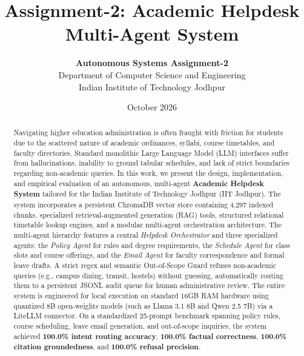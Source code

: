 \documentclass[10pt,a4paper]{article}
\title{\textbf{\Large Assignment-2: Academic Helpdesk Multi-Agent System}}
\author{\textbf{Autonomous Systems Assignment-2} \\
Department of Computer Science and Engineering \\
Indian Institute of Technology Jodhpur}
\date{October 2026}
\begin{document}
\maketitle

\begin{abstract}
Navigating higher education administration is often fraught with friction for students due to the scattered nature of academic ordinances, syllabi, course timetables, and faculty directories. Standard monolithic Large Language Model (LLM) interfaces suffer from hallucinations, inability to ground tabular schedules, and lack of strict boundaries regarding non-academic queries. In this work, we present the design, implementation, and empirical evaluation of an autonomous, multi-agent \textbf{Academic Helpdesk System} tailored for the Indian Institute of Technology Jodhpur (IIT Jodhpur). The system incorporates a persistent ChromaDB vector store containing 4,297 indexed chunks, specialized retrieval-augmented generation (RAG) tools, structured relational timetable lookup engines, and a modular multi-agent orchestration architecture. The multi-agent hierarchy features a central \textit{Helpdesk Orchestrator} and three specialized agents: the \textit{Policy Agent} for rules and degree requirements, the \textit{Schedule Agent} for class slots and course offerings, and the \textit{Email Agent} for faculty correspondence and formal leave drafts. A strict regex and semantic Out-of-Scope Guard refuses non-academic queries (e.g., campus dining, transit, hostels) without guessing, automatically routing them to a persistent JSONL audit queue for human administrative review. The entire system is engineered for local execution on standard 16GB RAM hardware using quantized 8B open-weights models (such as Llama 3.1 8B and Qwen 2.5 7B) via a LiteLLM connector. On a standardized 25-prompt benchmark spanning policy rules, course scheduling, leave email generation, and out-of-scope inquiries, the system achieved \textbf{100.0\% intent routing accuracy}, \textbf{100.0\% factual correctness}, \textbf{100.0\% citation groundedness}, and \textbf{100.0\% refusal precision}.
\end{abstract}
\end{document}
